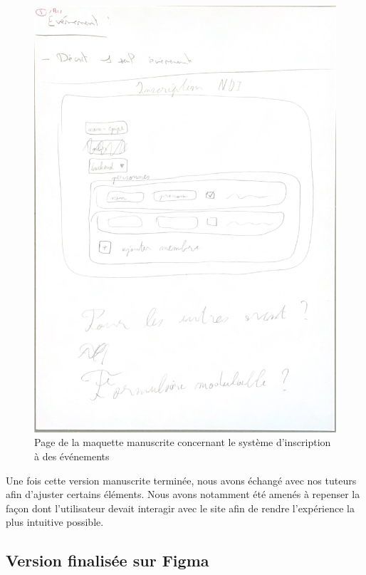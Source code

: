 \begin{figure}[H]
    \centering
    \includegraphics[scale=0.5]{assets/pictures/maquette-inscription.pdf}
    \captionsetup{justification=centering}
    \caption{Page de la maquette manuscrite concernant le système d'inscription à des événements}
    \label{fig:maquette-inscription}
\end{figure}


Une fois cette version manuscrite terminée, nous avons échangé avec nos tuteurs afin d’ajuster certains éléments.
Nous avons notamment été amenés à repenser la façon dont l'utilisateur devait interagir avec le site afin de rendre l'expérience la plus intuitive possible.

\subsection{Version finalisée sur Figma}

